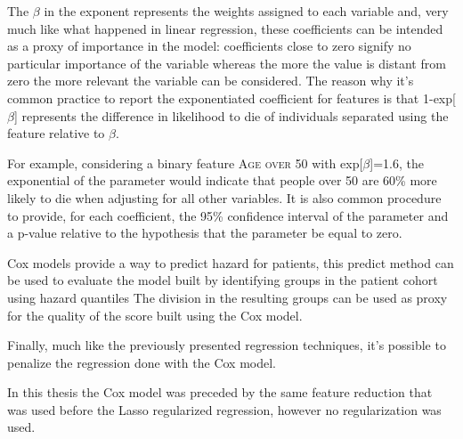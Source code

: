 The $\beta$ in the exponent represents the weights assigned to each variable and, very much like what happened in linear regression, these coefficients can be intended as a proxy of importance in the model: coefficients close to zero signify no particular importance of the variable whereas the more the value is distant from zero the more relevant the variable can be considered.
The reason why it's common practice to report the exponentiated coefficient for features is that 1-exp[$\beta$] represents the difference in likelihood to die of individuals separated using the feature relative to $\beta$. 

For example, considering a binary feature {\scshape Age over 50} with exp[$\beta$]=1.6, the exponential of the parameter would indicate that people over 50 are 60\% more likely to die when adjusting for all other variables.
It is also common procedure to provide, for each coefficient, the 95\% confidence interval of the parameter and a p-value relative to the hypothesis that the parameter be equal to zero.

Cox models provide a way to predict hazard for patients, this predict method can be used to evaluate the model built by identifying groups in the patient cohort using hazard quantiles 
The division in the resulting groups can be used as proxy for the quality of the score built using the Cox model.

Finally, much like the previously presented regression techniques, it's possible to penalize the regression done with the Cox model.

In this thesis the Cox model was preceded by the same feature reduction that was used before the Lasso regularized regression, however no regularization was used.






